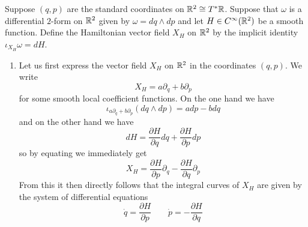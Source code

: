 \documentclass[a4paper, 12pt]{article}
\begin{document}
\begin{Exercise}
    Suppose $(q, p)$ are the standard coordinates on $\mathbb{R}^2 \cong T^*\mathbb{R}$.
    Suppose that $\omega$ is a differential $2$-form on $\mathbb{R}^2$ given by $\omega = dq \wedge dp$
    and let $H \in C^\infty(\mathbb{R}^2)$ be a smooth function.
    Define the Hamiltonian vector field $X_H$ on $\mathbb{R}^2$ by the implicit identity $\iota_{X_H}\omega = dH$.
    \begin{enumerate}[label=(\roman*)]
        \item Let us first express the vector field $X_H$ on $\mathbb{R}^2$ in the coordinates $(q,p)$.
            We write
            \[
                X_H = a \partial_q + b \partial_p
            \]
            for some smooth local coefficient functions.
            On the one hand we have
            \[
                \iota_{a\partial_q + b\partial_p}(dq \wedge dp)
                = a dp - bdq
            \]
            and on the other hand we have
            \[
                dH = \frac{\partial H}{\partial q}dq + \frac{\partial H}{\partial p}dp
            \]
            so by equating we immediately get
            \[
                X_H = \frac{\partial H}{\partial p} \partial_q - \frac{\partial H}{\partial q} \partial_p
            \]
            From this it then directly follows that the integral curves of $X_H$ are given by the system of differential equations
            \[
                \dot{q} = \frac{\partial H}{\partial p} \quad \quad \dot{p} = - \frac{\partial H}{\partial q}
            \]
            

\end{enumerate}
\end{Exercise}
\end{document}
